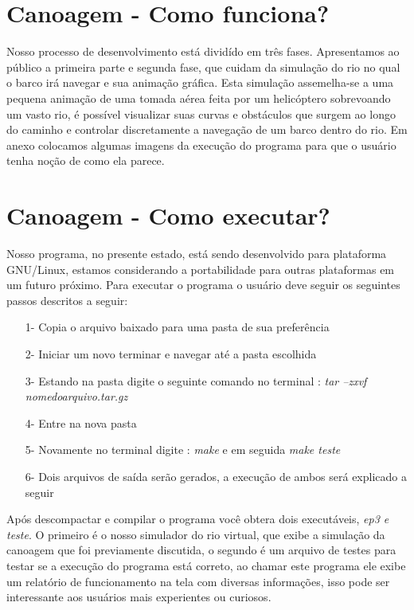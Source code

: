 \documentclass[a4paper,11pt]{article}
\begin{document}
\section{Canoagem - Como funciona?}
Nosso processo de desenvolvimento está dividído em três fases. Apresentamos ao público a primeira parte e segunda fase, que cuidam da simula\c{c}ão do rio no qual o barco irá navegar e sua animação gráfica. Esta simula\c{c}ão assemelha-se a uma pequena anima\c{c}ão de uma tomada aérea feita por um helicóptero sobrevoando um vasto rio, é possível visualizar suas curvas e obstáculos que surgem ao longo do caminho e controlar discretamente a navegação de um barco dentro do rio. Em anexo colocamos algumas imagens da execu\c{c}ão do programa para que o usuário tenha no\c{c}ão de como ela parece.


\section{Canoagem - Como executar?}
Nosso programa, no presente estado, está sendo desenvolvido para plataforma GNU/Linux, estamos considerando a portabilidade para outras plataformas em um futuro próximo. Para executar o programa o usuário deve seguir os seguintes passos descritos a seguir:

\begin{enumerate}
\item[1-]{Copia o arquivo baixado para uma pasta de sua preferência}
\item[2-]{Iniciar um novo terminar e navegar até a pasta escolhida}
\item[3-]{Estando na pasta digite o seguinte comando no terminal : \textit{tar --zxvf nomedoarquivo.tar.gz}}
\item[4-]{Entre na nova pasta}
\item[5-]{Novamente no terminal digite : \textit{make} e em seguida \textit{make teste}}
\item[6-]{Dois arquivos de saída serão gerados, a execu\c{c}ão de ambos será explicado a seguir}
\end{enumerate}

Após descompactar e compilar o programa você obtera dois executáveis, \textit{ep3 e teste}. O primeiro é o nosso simulador do rio virtual, que exibe a simulação da canoagem que foi previamente discutida, o segundo é um arquivo de testes para testar se a execu\c{c}ão do programa está correto, ao chamar este programa ele exibe um relatório de funcionamento na tela com diversas informa\c{c}ões, isso pode ser interessante aos usuários mais experientes ou curiosos. 
\end{document}
